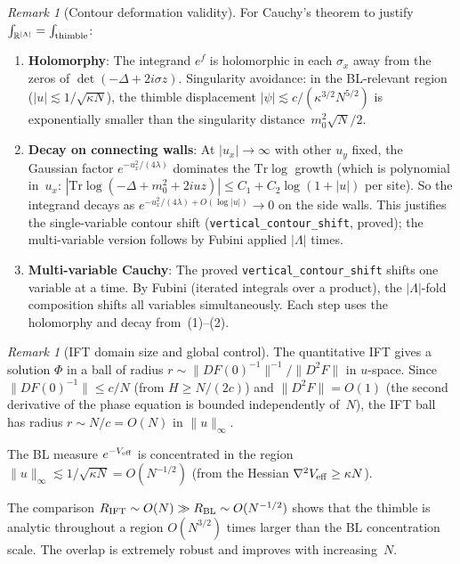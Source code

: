 \documentclass[12pt]{article}
\theoremstyle{definition}
\theoremstyle{remark}
\newtheorem{remark}[theorem]{Remark}
\newcommand{\R}{\mathbb{R}}
\newcommand{\Tr}{\mathrm{Tr}}
\newcommand{\La}{\Lambda}
\begin{document}
\begin{remark}[Contour deformation validity]
\label{rem:contour_validity}
For Cauchy's theorem to justify $\int_{\R^{|\La|}} = \int_{\rm thimble}$:
\begin{enumerate}
\item \textbf{Holomorphy}: The integrand $e^f$ is holomorphic in each
  $\sigma_x$ away from the zeros of $\det(-\Delta+2i\sigma z)$.
  Singularity avoidance: in the BL-relevant region
  ($|u| \lesssim 1/\sqrt{\kappa N}$), the thimble displacement
  $|\psi| \lesssim c/(\kappa^{3/2}N^{5/2})$ is exponentially
  smaller than the singularity distance~$m_0^2\sqrt{N}/2$.
\item \textbf{Decay on connecting walls}: At $|u_x| \to \infty$
  with other $u_y$ fixed, the Gaussian factor $e^{-u_x^2/(4\lambda)}$
  dominates the $\Tr\log$ growth (which is polynomial in~$u_x$:
  $|\Tr\log(-\Delta+m_0^2+2iuz)| \le C_1 + C_2\log(1+|u|)$ per site).
  So the integrand decays as $e^{-u_x^2/(4\lambda)+O(\log|u|)}
  \to 0$ on the side walls. This justifies the single-variable
  contour shift (\texttt{vertical\_contour\_shift}, proved);
  the multi-variable version follows by Fubini applied $|\La|$ times.
\item \textbf{Multi-variable Cauchy}: The proved
  \texttt{vertical\_contour\_shift} shifts one variable at a time.
  By Fubini (iterated integrals over a product), the $|\La|$-fold
  composition shifts all variables simultaneously. Each step uses
  the holomorphy and decay from~(1)--(2).
\end{enumerate}
\end{remark}

\begin{remark}[IFT domain size and global control]
\label{rem:ift_domain}
The quantitative IFT gives a solution $\Phi$ in a ball of radius
$r \sim \|DF(0)^{-1}\|^{-1}/\|D^2F\|$ in $u$-space.
Since $\|DF(0)^{-1}\| \le c/N$ (from $H \ge N/(2c)$) and
$\|D^2F\| = O(1)$ (the second derivative of the phase equation
is bounded independently of~$N$), the IFT ball has radius
$r \sim N/c = O(N)$ in $\|u\|_\infty$.

The BL measure $e^{-V_{\rm eff}}$ is concentrated in the region
$\|u\|_\infty \lesssim 1/\sqrt{\kappa N} = O(N^{-1/2})$
(from the Hessian $\nabla^2 V_{\rm eff} \ge \kappa N$).

The comparison $R_{\rm IFT} \sim O(N) \gg R_{\rm BL} \sim O(N^{-1/2})$
shows that the thimble is analytic throughout a region $O(N^{3/2})$
times larger than the BL concentration scale. The overlap is
extremely robust and improves with increasing~$N$.
\end{remark}
\end{document}
